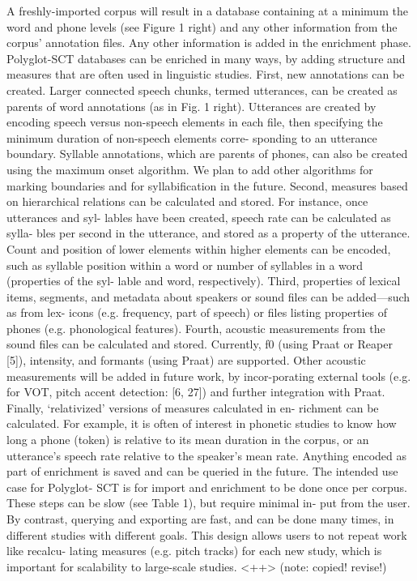 \documentclass[twoside,11pt]{article}
\begin{document}
A freshly-imported corpus will result in a database containing at
a minimum the word and phone levels (see Figure 1 right) and
any other information from the corpus’ annotation files. Any
other information is added in the enrichment phase.
Polyglot-SCT databases can be enriched in many ways, by
adding structure and measures that are often used in linguistic
studies. First, new annotations can be created. Larger connected
speech chunks, termed utterances, can be created as parents of
word annotations (as in Fig. 1 right). Utterances are created by
encoding speech versus non-speech elements in each file, then
specifying the minimum duration of non-speech elements corre-
sponding to an utterance boundary. Syllable annotations, which
are parents of phones, can also be created using the maximum
onset algorithm. We plan to add other algorithms for marking
boundaries and for syllabification in the future.
Second, measures based on hierarchical relations can be
calculated and stored. For instance, once utterances and syl-
lables have been created, speech rate can be calculated as sylla-
bles per second in the utterance, and stored as a property of the
utterance. Count and position of lower elements within higher
elements can be encoded, such as syllable position within a
word or number of syllables in a word (properties of the syl-
lable and word, respectively).
Third, properties of lexical items, segments, and metadata
about speakers or sound files can be added—such as from lex-
icons (e.g. frequency, part of speech) or files listing properties
of phones (e.g. phonological features).
Fourth, acoustic measurements from the sound files can
be calculated and stored. Currently, f0 (using Praat or Reaper
[5]), intensity, and formants (using Praat) are supported. Other
acoustic measurements will be added in future work, by incor-porating external tools (e.g. for VOT, pitch accent detection:
[6, 27]) and further integration with Praat.
Finally, ‘relativized’ versions of measures calculated in en-
richment can be calculated. For example, it is often of interest
in phonetic studies to know how long a phone (token) is relative
to its mean duration in the corpus, or an utterance’s speech rate
relative to the speaker’s mean rate.
Anything encoded as part of enrichment is saved and can
be queried in the future. The intended use case for Polyglot-
SCT is for import and enrichment to be done once per corpus.
These steps can be slow (see Table 1), but require minimal in-
put from the user. By contrast, querying and exporting are fast,
and can be done many times, in different studies with different
goals. This design allows users to not repeat work like recalcu-
lating measures (e.g. pitch tracks) for each new study, which is
important for scalability to large-scale studies.
<++> (note: copied! revise!)
\end{document}
